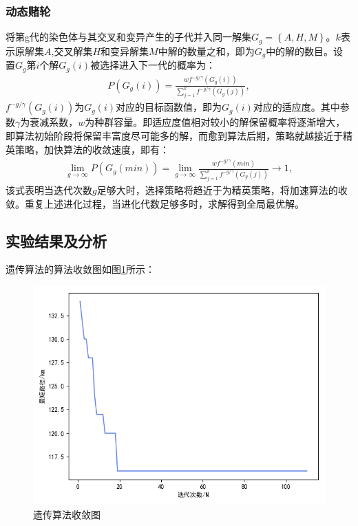 \documentclass{whutmod}
\begin{document}
         \subsubsection{动态赌轮}
         将第g代的染色体与其交叉和变异产生的子代并入同一解集$G_g=\left \{A,H,M\right \}$。$k$表示原解集$A$,交叉解集$H$和变异解集$M$中解的数量之和，即为$G_g$中的解的数目。设置$G_g$第$i$个解$G_g(i)$被选择进入下一代的概率为：
         \begin{gather}
          P(G_{g}(i))=\frac{wf^{-g/\gamma }(G_{g}(i))}{\sum_{j=1}^{k}f^{-g/\gamma }(G_{g}(j))},
         \end{gather}
         $f^{-g/\gamma }(G_{g}(i))$为$G_{g}(i)$对应的目标函数值，即为$G_{g}(i)$对应的适应度。其中参数$\gamma$为衰减系数，$w$为种群容量。即适应度值相对较小的解保留概率将逐渐增大，
         即算法初始阶段将保留丰富度尽可能多的解，而愈到算法后期，策略就越接近于精英策略，加快算法的收敛速度，即有：
           \begin{gather}
           \lim_{g\rightarrow \infty } P(G_{g}(min))=\lim_{g\rightarrow \infty }\frac{wf^{-g/\gamma }(min)}{\sum_{j=1}^{k}f^{-g/\gamma }(G_{g}(j))}\rightarrow 1 ,
         \end{gather}
         该式表明当迭代次数$g$足够大时，选择策略将趋近于为精英策略，将加速算法的收敛。重复上述进化过程，当进化代数足够多时，求解得到全局最优解。
         
         
      \subsection{实验结果及分析}
      遗传算法的算法收敛图如图\ref{llsffssl}所示：
               \begin{figure}[H]
      	\centering
      	\includegraphics[width=\textwidth]{figures/y1.png}
      	\caption{遗传算法收敛图
      	}\label{llsffssl}
      \end{figure}
      
\end{document}
